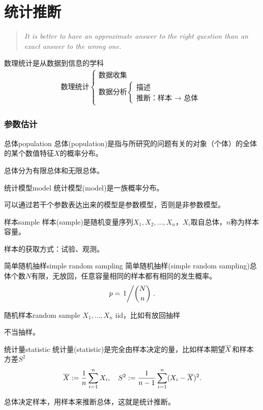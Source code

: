 \part{统计推断}
\begin{quote}
	\textit{It is better to have an approximate answer to the right question than an exact answer to the wrong one.}

\end{quote}
数理统计是从数据到信息的学科
\begin{align*}
	\text{数理统计}\begin{cases}
		\text{数据收集}\\
		\text{数据分析}\begin{cases}
			\text{描述}\\
			\text{推断：样本 }\to\text{ 总体}
		\end{cases}
	\end{cases}
\end{align*}
\section{参数估计}
\begin{definition}{总体}{population}
	总体(population)是指与所研究的问题有关的对象（个体）的全体的某个数值特征$X$的概率分布。
\end{definition}
总体分为有限总体和无限总体。
\begin{definition}{统计模型}{model}
	统计模型(model)是一族概率分布。
\end{definition}
可以通过若干个参数表达出来的模型是参数模型，否则是非参数模型。
\begin{definition}{样本}{sample}
	样本(sample)是随机变量序列$X_1,X_2,\ldots,X_n$，$X_i$取自总体，$n$称为样本容量。
\end{definition}
样本的获取方式：试验、观测。
\begin{definition}{简单随机抽样}{simple random sampling}
	简单随机抽样(simple random sampling)总体个数$N$有限，无放回，任意容量相同的样本都有相同的发生概率。
	\[
		p=\left.1\middle\slash {N\choose n}\right..
	\]
\end{definition}
\begin{definition}{随机样本}{random sample}
	$X_1,\ldots,X_n$ iid，比如有放回抽样
\end{definition}
不当抽样。
\begin{definition}{统计量}{statistic}
	统计量(statistic)是完全由样本决定的量，比如样本期望$\overline X$和样本方差$S^2$
	\[
		\overline X:=\frac1n\sum_{i=1}^nX_i,\quad S^2:=\frac1{n-1}\sum_{i=1}^n(X_i-\overline X)^2.
	\]
\end{definition}
总体决定样本，用样本来推断总体，这就是统计推断。
